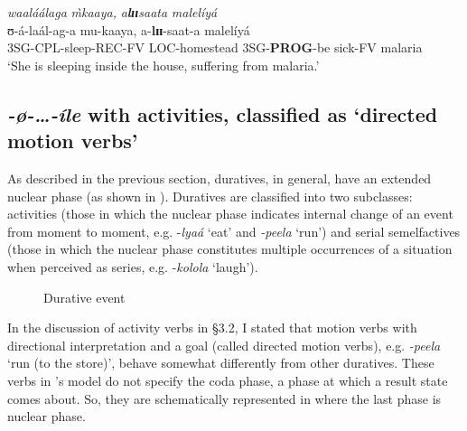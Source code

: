 \documentclass[output=paper,newtxmath,modfonts,nonflat,draftmode]{langsci/langscibook}
\begin{document}
 \ex \glll \textit{waaláálaga} \textit{\`{m}}\textit{kaaya,} \textit{a}\textbf{\textit{l}}\textbf{\textit{ɪɪ}}\textit{saata}  \textit{malelíyá}\\
      ʊ-á-laál-ag-a             mu-kaaya,      a-\textbf{lɪɪ}-saat-a                malelíyá\\
       3SG-CPL-sleep-REC-FV LOC-homestead 3SG-\textbf{PROG}-be sick-FV malaria\\
      \glt ‘She is sleeping inside the house, suffering from malaria.’
\z
\z

\subsection{\textit{-}\textit{ø-…-íle} with activities, classified as ‘directed motion verbs’}\label{sec:kanijo:4.3}

As described in the previous section, duratives, in general, have an extended nuclear phase (as shown in ). Duratives are classified into two subclasses: activities (those in which the nuclear phase indicates internal change of an event from moment to moment, e.g. -\textit{lyaá} ‘eat’ and \textit{-peela} ‘run’) and serial semelfactives (those in which the nuclear phase constitutes multiple occurrences of a situation when perceived as series, e.g. -\textit{kolola} ‘laugh’). 

\begin{figure}
\caption{Durative event\label{fig:kanijo:9}}
\end{figure} 

In the discussion of activity verbs in §3.2, I stated that motion verbs with directional interpretation and a goal (called directed motion verbs), e.g. \textit{-peela} ‘run (to the store)’, behave somewhat differently from other duratives. These verbs in \citeauthor{Botne2000}'s model do not specify the coda phase, a phase at which a result state comes about. So, they are schematically represented in  where the last phase is nuclear phase. 
\end{document}

